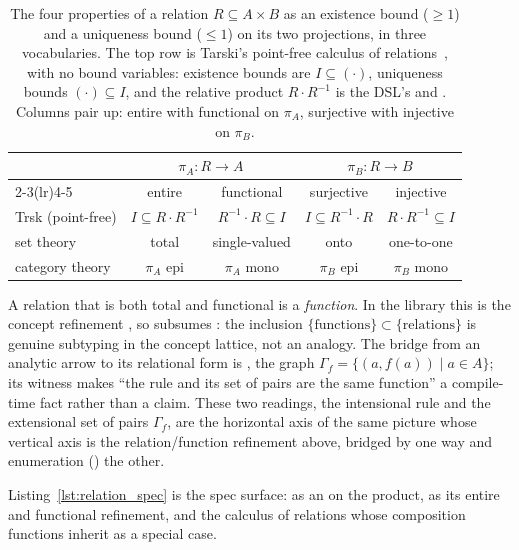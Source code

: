\documentclass[11pt, a4paper]{article}
\begin{document}
\begin{table}[htbp]
\centering
\begin{tabular}{@{}lcccc@{}}
\toprule
 & \multicolumn{2}{c}{$\pi_A : R \to A$} & \multicolumn{2}{c}{$\pi_B : R \to B$} \\
\cmidrule(lr){2-3}\cmidrule(lr){4-5}
 & entire & functional & surjective & injective \\
\midrule
Trsk (point-free) & $I \subseteq R\cdot R^{-1}$ & $R^{-1}\!\cdot R \subseteq I$ & $I \subseteq R^{-1}\!\cdot R$ & $R\cdot R^{-1} \subseteq I$ \\
\addlinespace
set theory & total & single-valued & onto & one-to-one \\
\addlinespace
category theory & $\pi_A$ epi & $\pi_A$ mono & $\pi_B$ epi & $\pi_B$ mono \\
\bottomrule
\end{tabular}
\caption{The four properties of a relation $R \subseteq A \times B$ as an existence bound ($\ge 1$) and a uniqueness bound ($\le 1$) on its two projections, in three vocabularies.
The top row is Tarski's point-free calculus of relations~\cite{tarski1941calculus}, with no bound variables: existence bounds are $I \subseteq (\cdot)$, uniqueness bounds $(\cdot) \subseteq I$, and the relative product $R\cdot R^{-1}$ is the DSL's  and \cppinline{>>}.
Columns pair up: entire with functional on $\pi_A$, surjective with injective on $\pi_B$.}
\label{tab:relation-quantifier}
\end{table}

A relation that is both total and functional is a \emph{function}.
In the library this is the concept refinement , so  subsumes : the inclusion $\{\text{functions}\} \subset \{\text{relations}\}$ is genuine subtyping in the concept lattice, not an analogy.
The bridge from an analytic arrow to its relational form is , the graph $\Gamma_f = \{(a, f(a)) \mid a \in A\}$; its  witness makes ``the rule and its set of pairs are the same function'' a compile-time fact rather than a claim.
These two readings, the intensional rule  and the extensional set of pairs $\Gamma_f$, are the horizontal axis of the same picture whose vertical axis is the relation/function refinement above, bridged by  one way and enumeration () the other.

Listing~\ref{lst:relation_spec} is the spec surface:  as an  on the product,  as its entire and functional refinement, and the calculus of relations whose composition \cppinline{>>} functions inherit as a special case.
\end{document}
